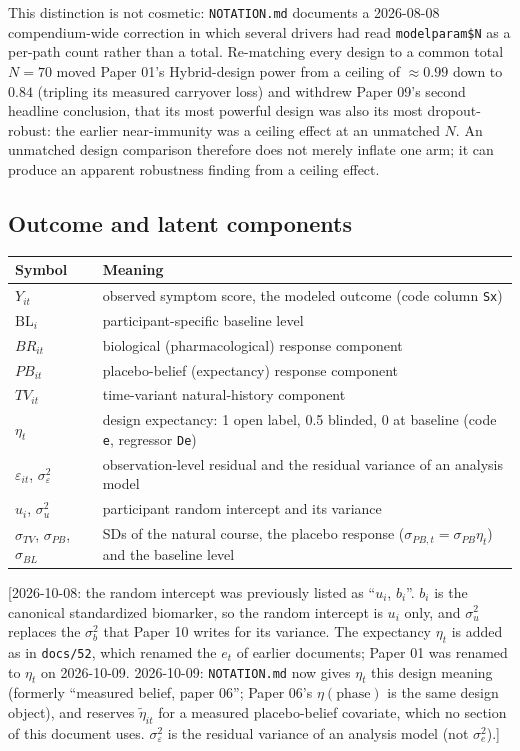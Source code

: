\documentclass[11pt]{article}
\newcommand{\note}[1]{\textcolor{blue!60!black}{\small [#1]}}
\newcommand{\code}[1]{\texttt{#1}}
\begin{document}
This distinction is not cosmetic: \code{NOTATION.md} documents a
2026-08-08 compendium-wide correction in which several drivers had
read \code{modelparam\$N} as a per-path count rather than a total.
Re-matching every design to a common total $N=70$ moved Paper 01's
Hybrid-design power from a ceiling of $\approx 0.99$ down to $0.84$
(tripling its measured carryover loss) and withdrew Paper 09's
second headline conclusion, that its most powerful design was also its
most dropout-robust: the earlier near-immunity was a ceiling effect at
an unmatched $N$. An unmatched design comparison therefore does not
merely inflate one arm; it can produce an apparent robustness finding
from a ceiling effect.

\subsection{Outcome and latent components}
\label{sec:notation-outcome}

\begin{center}
\begin{tabular}{@{}lp{}@{}}
\toprule
Symbol & Meaning \\
\midrule
$Y_{it}$ & observed symptom score, the modeled outcome (code column \code{Sx}) \\
$\mathrm{BL}_i$ & participant-specific baseline level \\
$BR_{it}$ & biological (pharmacological) response component \\
$PB_{it}$ & placebo-belief (expectancy) response component \\
$TV_{it}$ & time-variant natural-history component \\
$\eta_t$ & design expectancy: 1 open label, 0.5 blinded, 0 at baseline (code \code{e}, regressor \code{De}) \\
$\varepsilon_{it}$, $\sigma_\varepsilon^2$ & observation-level residual and the residual variance of an analysis model \\
$u_i$, $\sigma_u^2$ & participant random intercept and its variance \\
$\sigma_{TV}$, $\sigma_{PB}$, $\sigma_{BL}$ & SDs of the natural course, the placebo response ($\sigma_{PB,t} = \sigma_{PB}\eta_t$) and the baseline level \\
\bottomrule
\end{tabular}
\end{center}

\note{2026-10-08: the random intercept was previously listed as
``$u_i$, $b_i$''. $b_i$ is the canonical standardized biomarker, so
the random intercept is $u_i$ only, and $\sigma_u^2$ replaces the
$\sigma_b^2$ that Paper 10 writes for its variance. The expectancy
$\eta_t$ is added as in \code{docs/52}, which renamed the $e_t$ of
earlier documents; Paper 01 was renamed to $\eta_t$ on 2026-10-09.
2026-10-09: \code{NOTATION.md} now gives $\eta_t$ this design meaning
(formerly ``measured belief, paper 06''; Paper 06's
$\eta(\text{phase})$ is the same design object), and reserves
$\tilde\eta_{it}$ for a measured placebo-belief covariate, which no
section of this document uses. $\sigma_\varepsilon^2$ is the residual
variance of an analysis model (not $\sigma_e^2$).}
\end{document}

